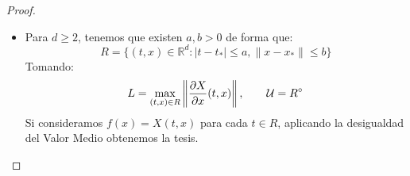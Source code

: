 \begin{lema}
\begin{proof}
\begin{itemize}
\begin{figure}[H]
            \end{figure}
            \noindent
            Tomamos:
            \begin{equation*}
                L = \max_{(t,x)\in R} \left|\frac{\partial X}{\partial x}(t,x)\right|, \qquad \cc{U} = R^\circ
            \end{equation*}
            Dados $(t,x_1),(t,x_2)\in \cc{U}$, tenemos que $x\mapsto X(t,x) \in C^1(\left]x_\ast - b, x_\ast + b\right[)$ y le podemos aplicar el Teorema del Valor Medio a esta función real de variable real:
            \begin{equation*}
                X(t,x_1) - X(t,x_2) = \frac{\partial X}{\partial x}(t,\xi)(x_1-x_2)
            \end{equation*}
            para cierto punto $\xi \in \mathbb{R}$ intermedio a $x_1$ y $x_2$, con lo que tenemos que $(t,\xi)\in R$, luego podemos acotar este valor real por $L$, obteniendo que:
            \begin{equation*}
                |X(t,x_1) - X(t,x_2)| \leq L|x_1-x_2|
            \end{equation*}
            \item Para $d\geq 2$, tenemos que existen $a,b>0$ de forma que:
                \begin{equation*}
                    R = \{(t,x)\in \mathbb{R}^d : |t-t_\ast| \leq a, \|x-x_\ast\|\leq b\}
                \end{equation*}
                Tomando:
                \begin{equation*}
                    L = \max_{(t,x)\in R}\left\|\frac{\partial X}{\partial x}(t,x)\right\|, \qquad \mathcal{U} = R^\circ
                \end{equation*}
                Si consideramos $f(x) = X(t,x)$ para cada $t\in R$, aplicando la desigualdad del Valor Medio obtenemos la tesis.
        \end{itemize}
    \end{proof}
\end{lema}

